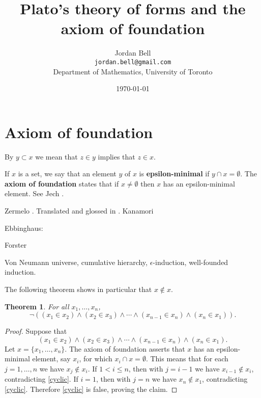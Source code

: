 \documentclass{article}
\newtheorem{theorem}{Theorem}
\theoremstyle{definition}
\begin{document}
\title{Plato's theory of forms and the axiom of foundation}
\author{Jordan Bell\\ \texttt{jordan.bell@gmail.com}\\Department of Mathematics, University of Toronto}

\date{\today}

\maketitle


\section{Axiom of foundation}
By $y \subset x$ we mean that $z \in y$ implies that $z \in x$. 


If $x$ is a set, we say that an element $y$ of $x$ is \textbf{epsilon-minimal} if
$y \cap x = \emptyset$. 
The \textbf{axiom of foundation} states that if $x \neq \emptyset$ then $x$ has an epsilon-minimal element. 
See Jech  \cite[p.~63, Chapter 6]{jech}.

Zermelo \cite{zermelo1930}. Translated and glossed in \cite[pp.~1208--1233]{ewaldII}. Kanamori \cite{kanamori}

Ebbinghaus: \cite{ebbinghaus} 

Forster \cite{forster}

Von Neumann universe, cumulative hierarchy, $\epsilon$-induction, well-founded induction.

The following theorem shows in particular that $x \not \in x$. 


\begin{theorem}
For all  $x_1,\ldots,x_n$,
\[
\neg ((x_1 \in x_2) \wedge (x_2 \in x_3) \wedge \cdots \wedge (x_{n-1} \in x_n) \wedge (x_n \in x_1)).
\] 
\end{theorem}
\begin{proof}
Suppose that
\begin{equation}
(x_1 \in x_2) \wedge (x_2 \in x_3) \wedge \cdots \wedge (x_{n-1} \in x_n) \wedge (x_n \in  x_1).
\label{cyclic}
\end{equation}
Let $x=\{x_1,\ldots,x_n\}$. The axiom of foundation asserts that $x$ has an epsilon-minimal element, say $x_i$, for which
$x_i \cap x = \emptyset$. This means that for each $j=1,\ldots,n$ we have $x_j \not \in x_i$. If $1<i \leq n$, then with
$j=i-1$ we have $x_{i-1} \not \in x_i$, contradicting \eqref{cyclic}. If $i=1$, then with $j=n$ we have $x_n \not \in x_1$, contradicting
\eqref{cyclic}. Therefore \eqref{cyclic} is false, proving the claim.
\end{proof}
\end{document}
